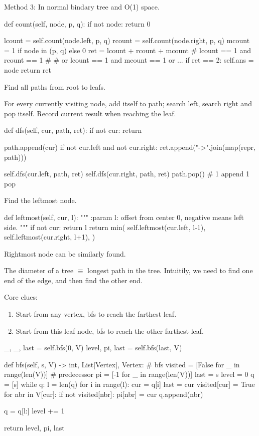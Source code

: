 Method 3: In normal bindary tree and O(1) space.
\begin{python}
def count(self, node, p, q):
    if not node:
        return 0

    lcount = self.count(node.left, p, q)
    rcount = self.count(node.right, p, q)
    mcount = 1 if node in (p, q) else 0
    ret = lcount + rcount + mcount
    # lcount == 1 and rcount == 1 # 
    # or lcount == 1 and mcount == 1 or ...
    if ret == 2:
        self.ans = node
    return ret
\end{python}

 Find all paths from root to leafs. 

For every currently visiting node, add itself to path; search left, search right and pop itself. Record current result when reaching the leaf.
\begin{python}
def dfs(self, cur, path, ret):
    if not cur:
        return

    path.append(cur)
    if not cur.left and not cur.right:
        ret.append("->".join(map(repr, path)))

    self.dfs(cur.left, path, ret)
    self.dfs(cur.right, path, ret)
    path.pop()  # 1 append 1 pop
\end{python}

 Find the leftmost node. 
\begin{python}
def leftmost(self, cur, l):
    """
    :param l: offset from center 0, negative means left side. 
    """
    if not cur:
        return l
    return min(
        self.leftmost(cur.left, l-1), 
        self.leftmost(cur.right, l+1),
    )
\end{python}

Rightmost node can be similarly found.

 The diameter of a tree $\equiv$ longest path in the tree. Intuitily, we need to find one end of the edge, and then find the other end. 

Core clues:
\begin{enumerate}
\item {} Start from any vertex, bfs to reach the farthest leaf.
\item {} Start from this leaf node, bfs to reach the other farthest leaf. 
\end{enumerate}
\begin{python}
_, _, last = self.bfs(0, V)
level, pi, last = self.bfs(last, V)

def bfs(self, s, V) -> int, List[Vertex], Vertex:
    # bfs
    visited = [False for _ in range(len(V))]
    # predecessor 
    pi = [-1 for _ in range(len(V))]
    last = s
    level = 0
    q = [s]
    while q:
        l = len(q)
        for i in range(l):
            cur = q[i]
            last = cur
            visited[cur] = True
            for nbr in V[cur]:
                if not visited[nbr]:
                    pi[nbr] = cur
                    q.append(nbr)

        q = q[l:]
        level += 1

    return level, pi, last
\end{python}

